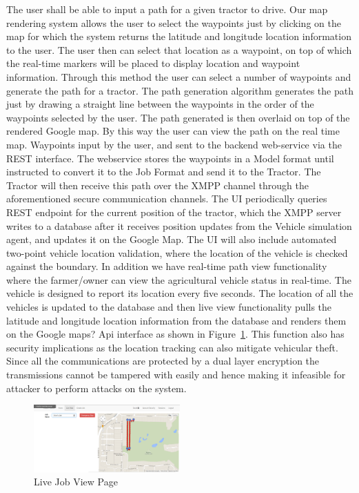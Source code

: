 \documentclass[conference,12pt]{IEEEtran}
\begin{document}
The user shall be able to input a path for a given tractor to drive. Our map rendering system allows the user to select the waypoints just by clicking on the map for which the system returns the latitude and longitude location information to the user. The user then can select that location as a waypoint, on top of which the real-time markers will be placed to display location and waypoint information. Through this method the user can select a number of waypoints and generate the path for a tractor. The path generation algorithm generates the path just by drawing a straight line between the waypoints in the order of the waypoints selected by the user. The path generated is then overlaid on top of the rendered Google map. By this way the user can view the path on the real time map. Waypoints input by the user, and sent to the backend web-service via the REST interface. The webservice stores the waypoints in a Model format until instructed to convert it to the Job Format and send it to the Tractor.
The Tractor will then receive this path over the XMPP channel through the aforementioned secure communication channels. The UI periodically queries REST endpoint for the current position of the tractor, which the XMPP server writes to a database after it receives position updates from the Vehicle simulation agent, and updates it on the Google Map. The UI will also include automated two-point vehicle location validation, where the location of the vehicle is checked against the boundary.
In addition we have real-time path view functionality where the farmer/owner can
view the agricultural vehicle status in real-time. The vehicle is designed to
report its location every five seconds. The location of all the vehicles is
updated to the database and then live view functionality pulls the latitude and
longitude location information from the database and renders them on the Google
maps? Api interface as shown in Figure~\ref{fig:livejobpage}. This function also has security
implications as the location tracking can also mitigate vehicular theft. Since
all the communications are protected by a dual layer encryption the
transmissions cannot be tampered with easily and hence making it infeasible for
attacker to perform attacks on the system. 


\begin{figure}
\centering
\includegraphics[width=0.5\textwidth]{Images/Picture6.png}
\caption{Live Job View Page}
\label{fig:livejobpage}
\end{figure}
\end{document}
